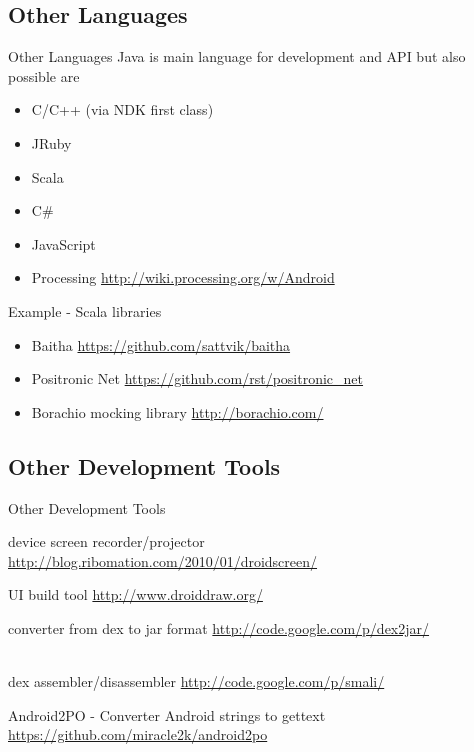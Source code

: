 \documentclass[aspectratio=169]{beamer}
\newcommand{\surl}[1] {{\tiny \url{#1}}}
\begin{document}
  \subsection{Other Languages}
    \begin{frame}{Other Languages}
      Java is main language for development and API but also possible are 
      \begin{itemize}
      \item C/C++ (via NDK first class)
      \item JRuby
      \item Scala
      \item C\#
      \item JavaScript
      \item Processing \surl{http://wiki.processing.org/w/Android}
      \end{itemize}
    \end{frame}

    \begin{frame}{Example - Scala libraries}
      \begin{itemize}
       \item Baitha \surl{https://github.com/sattvik/baitha}
       \item Positronic Net \surl{https://github.com/rst/positronic_net}
       \item Borachio mocking library \surl{http://borachio.com/}
      \end{itemize}
    \end{frame}

  \subsection{Other Development Tools}

    \begin{frame}{Other Development Tools}
      \begin{description}
        \item<1->[Droid at Screen] device screen recorder/projector \surl{http://blog.ribomation.com/2010/01/droidscreen/}

        \item<2->[DroidDraw] UI build tool \surl{http://www.droiddraw.org/}
 
        \item<3->[dex2jar] converter from dex to jar format \surl{http://code.google.com/p/dex2jar/}

        \item<4->[smali/baksmali] \hfill \\ dex assembler/disassembler \surl{http://code.google.com/p/smali/}

        \item<5->Android2PO - Converter Android strings to gettext \surl{https://github.com/miracle2k/android2po}
      \end{description}
   \end{frame}
\end{document}
